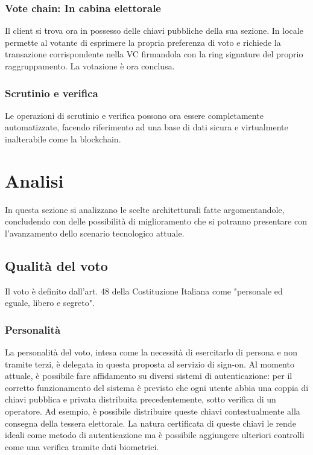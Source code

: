 		\subsubsection{Vote chain: In cabina elettorale}
			Il client si trova ora in possesso delle chiavi pubbliche della sua sezione. In locale permette al votante di esprimere la propria preferenza di voto e richiede la transazione corrispondente nella VC firmandola con la ring signature del proprio raggruppamento.
			La votazione è ora conclusa.
		
		\subsubsection{Scrutinio e verifica}
			Le operazioni di scrutinio e verifica possono ora essere completamente automatizzate, facendo riferimento ad una base di dati sicura e virtualmente inalterabile come la blockchain.

\section{Analisi}
	In questa sezione si analizzano le scelte architetturali fatte argomentandole, concludendo con delle possibilità di miglioramento che si potranno presentare con l'avanzamento dello scenario tecnologico attuale.
	
	\subsection{Qualità del voto}
		Il voto è definito dall'art. 48 \cite{art48} della Costituzione Italiana come "personale ed eguale, libero e segreto".
		\subsubsection{Personalità}\label{subsec:personalita_voto}
			La personalità del voto, intesa come la necessità di esercitarlo di persona e non tramite terzi, è delegata in questa proposta al servizio di sign-on. Al momento attuale, è possibile fare affidamento su diversi sistemi di autenticazione: per il corretto funzionamento del sistema è previsto che ogni utente abbia una coppia di chiavi pubblica e privata distribuita precedentemente, sotto verifica di un operatore. Ad esempio, è possibile distribuire queste chiavi contestualmente alla consegna della tessera elettorale. La natura certificata di queste chiavi le rende ideali come metodo di autenticazione ma è possibile aggiungere ulteriori controlli come una verifica tramite dati biometrici.
		
